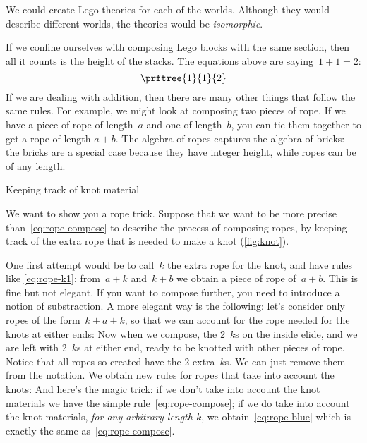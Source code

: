 We could create Lego theories for each of the worlds. Although they would describe different worlds, the theories would be \emph{isomorphic}.

If we confine ourselves with composing Lego blocks with the same section, then all it counts is the height of the stacks.
The equations above are saying~$1+1=2$:
%
\begin{equation}
    \prftree{1}{1}{2}
\end{equation}
%
If we are dealing with addition, then there are many other things that follow the same rules.
For example, we might look at composing two pieces of rope. If we have a piece of rope of length~$a$ and one of length~$b$, you can tie them together to get a rope of length $a+b$.
%
%
The algebra of ropes captures the algebra of bricks: the bricks are a special case because they have integer height, while ropes can be of any length.
\begin{marginfigure}
    \caption{Keeping track of knot material}
    \label{fig:knot}
\end{marginfigure}


We want to show you a rope trick.
Suppose that we want to be more precise than~\cref{eq:rope-compose} to describe the process of composing ropes, by keeping track of the extra rope that is needed to make a knot (\cref{fig:knot}).


One first attempt would be to call~$k$ the extra rope for the knot, and have rules like \cref{eq:rope-k1}: from~$a + k$ and~$k + b$ we obtain a piece of rope of~$a+b$.
%
%
%
This is fine but not elegant.
If you want to compose further, you need to introduce a notion of substraction.
%
%
A more elegant way is the following: let's consider only ropes of the form~$k + a + k$, so that we can account for the rope needed for the knots at either ends:
%
%
Now when we compose, the 2~$k$s on the inside elide, and we are left with 2~$k$s at either end, ready to be knotted with other pieces of rope.
Notice that all ropes so created have the 2 extra~$k$s.
We can just remove them from the notation. We obtain new rules for ropes that take into account the knots:
%
%
And here's the magic trick: if we don't take into account the knot materials we have the simple rule~\cref{eq:rope-compose}; if we do take into account the knot materials, \emph{for any arbitrary length $k$}, we obtain~\cref{eq:rope-blue} which is exactly the same as~\cref{eq:rope-compose}.

